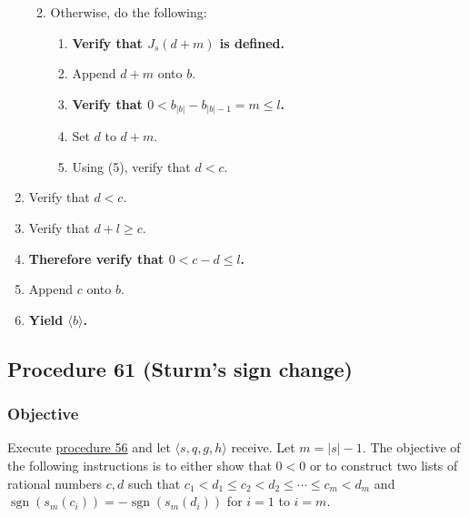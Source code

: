 \documentclass[twocolumn]{article}
\DeclareMathOperator{\sgn}{sgn}
\begin{document}
\begin{enumerate}
\begin{enumerate}
\begin{enumerate}
						\end{enumerate}
						\item Otherwise, do the following:
						\begin{enumerate}
							\item \textbf{Verify that $J_s(d+m)$ is defined.}
							\item Append $d+m$ onto $b$.
							\item \textbf{Verify that $0<b_{\lvert b\rvert}-b_{\lvert b\rvert-1}=m\le l$.}
							\item Set $d$ to $d+m$.
							\item Using (5), verify that $d<c$.
						\end{enumerate}
					\end{enumerate}
					\item Verify that $d<c$.
					\item Verify that $d+l\ge c$.
					\item \textbf{Therefore verify that $0<c-d\le l$.}
					\item Append $c$ onto $b$.
					\item \textbf{Yield $\langle b\rangle$.}
				\end{enumerate}
		\subsection{Procedure 61 (Sturm's sign change)}\label{sec:procedure 61}
			\subsubsection{Objective}
				Execute \hyperref[sec:procedure 56]{procedure 56} and let $\langle s,q,g,h\rangle$ receive. Let $m=\lvert s\rvert-1$. The objective of the following instructions is to either show that $0<0$ or to construct two lists of rational numbers $c,d$ such that $c_1<d_1\le c_2<d_2\le\cdots\le c_m<d_m$ and $\sgn(s_m(c_i))=-\sgn(s_m(d_i))$ for $i=1$ to $i=m$.
\end{document}
